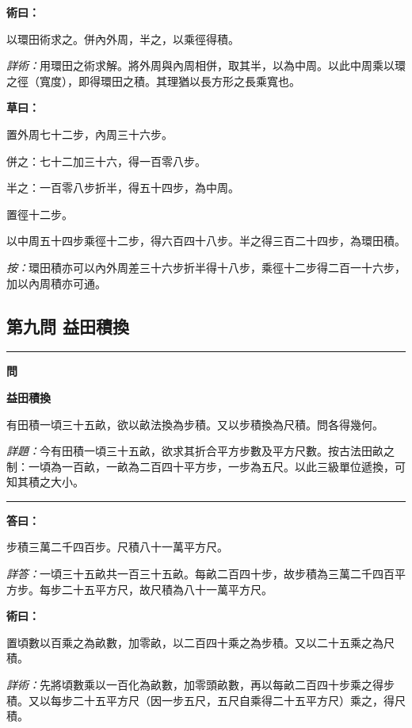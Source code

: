 \documentclass[11pt,a4paper]{article}
\newenvironment{problem}[1][]{%
  \medskip\noindent\rule{\textwidth}{0.4pt}%
  \par\noindent\textbf{\color{sectioncolor}#1}\par\nopagebreak%
  \smallskip%
}{%
  \par\noindent\rule{\textwidth}{0.4pt}\medskip%
}
\newenvironment{answer}{%
  \medskip\noindent{\color{answercolor}\rule{0.5\textwidth}{0.5pt}}%
  \par\color{answercolor}%
}{%
  \par\medskip%
}
\newenvironment{method}{%
  \medskip\noindent{\color{methodcolor}\rule{0.5\textwidth}{0.5pt}}%
  \par\color{methodcolor}%
}{%
  \par\medskip%
}
\newenvironment{calculation}{%
  \medskip\noindent{\color{caocolor}\rule{0.4\textwidth}{0.4pt}}%
  \par\color{caocolor}%
}{%
  \par\medskip%
}
\begin{document}
\begin{method}
\textbf{術曰：}

以環田術求之。併內外周，半之，以乘徑得積。

\medskip
\textit{詳術：}用環田之術求解。將外周與內周相併，取其半，以為中周。以此中周乘以環之徑（寬度），即得環田之積。其理猶以長方形之長乘寬也。
\end{method}

\begin{calculation}
\textbf{草曰：}

置外周七十二步，內周三十六步。

併之：七十二加三十六，得一百零八步。

半之：一百零八步折半，得五十四步，為中周。

置徑十二步。

以中周五十四步乘徑十二步，得六百四十八步。半之得三百二十四步，為環田積。

\textit{按：}環田積亦可以內外周差三十六步折半得十八步，乘徑十二步得二百一十六步，加以內周積亦可通。
\end{calculation}

\subsection*{第九問 益田積換}

\begin{problem}[\textbf{問}]
\textbf{\color{sectioncolor}益田積換}

有田積一頃三十五畝，欲以畝法換為步積。又以步積換為尺積。問各得幾何。

\medskip
\textit{詳題：}今有田積一頃三十五畝，欲求其折合平方步數及平方尺數。按古法田畝之制：一頃為一百畝，一畝為二百四十平方步，一步為五尺。以此三級單位遞換，可知其積之大小。
\end{problem}

\begin{answer}
\textbf{答曰：}

步積三萬二千四百步。尺積八十一萬平方尺。

\medskip
\textit{詳答：}一頃三十五畝共一百三十五畝。每畝二百四十步，故步積為三萬二千四百平方步。每步二十五平方尺，故尺積為八十一萬平方尺。
\end{answer}

\begin{method}
\textbf{術曰：}

置頃數以百乘之為畝數，加零畝，以二百四十乘之為步積。又以二十五乘之為尺積。

\medskip
\textit{詳術：}先將頃數乘以一百化為畝數，加零頭畝數，再以每畝二百四十步乘之得步積。又以每步二十五平方尺（因一步五尺，五尺自乘得二十五平方尺）乘之，得尺積。
\end{method}
\end{document}
